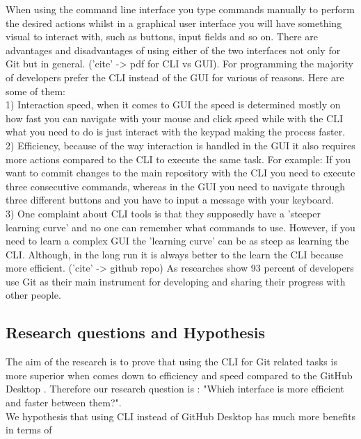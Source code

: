 \documentclass[]{report}
\begin{document}
	When using the command line interface you type commands manually to perform the desired actions whilst in a graphical user interface you will have something visual to interact with, such as buttons, input fields and so on. There are advantages and disadvantages of using either of the two interfaces not only for Git but in general. ('cite' -> pdf for CLI vs GUI). For programming the majority of developers prefer the CLI instead of the GUI for various of reasons. Here are some of them: \\1) Interaction speed, when it comes to GUI the speed is determined mostly on how fast you can navigate with your mouse and click speed while with the CLI what you need to do is just interact with the keypad making the process faster. \\2) Efficiency, because of the way interaction is handled in the GUI it also requires more actions compared to the CLI to execute the same task. For example: If you want to commit changes to the main repository with the CLI you need to execute three consecutive commands, whereas in the GUI you need to navigate through three different buttons and you have to input a message with your keyboard. \\3) One complaint about CLI tools is that they supposedly have a 'steeper learning curve' and no one can remember what commands to use. However, if you need to learn a complex GUI the 'learning curve' can be as steep as learning the CLI. Although, in the long run it is always better to the learn the CLI because more efficient. ('cite' -> github repo)
	As researches show 93 percent of developers use Git as their main instrument for developing and sharing their progress with other people. 
	
	\subsection{Research questions and Hypothesis}
	The aim of the research is to prove that using the CLI for Git related tasks is more superior when comes down to efficiency and speed compared to the GitHub Desktop . Therefore our research question is : "Which interface is more efficient and faster between them?".\\
	
	We hypothesis that using CLI instead of GitHub Desktop has much more benefits in terms of 
\end{document}
